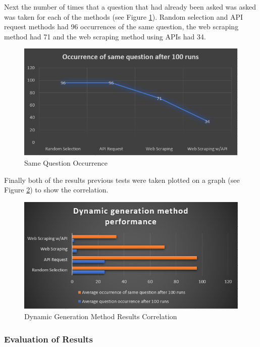 \documentclass[12pt,a4paper]{article}
\begin{document}
Next the number of times that a question that had already been asked was asked was taken for each of the methods (see Figure \ref{r2}). Random selection and API request methods had 96 occurrences of the same question, the web scraping method had 71 and the web scraping method using APIs had 34.

\begin{figure}[!ht]
    \centering
    \includegraphics[width=1.0\textwidth]{Figs/results2.PNG} 
    \caption{Same Question Occurrence} 
    \label{r2}
\end{figure}  

Finally both of the results previous tests were taken plotted on a graph  (see Figure \ref{r3}) to show the correlation.

\begin{figure}[!ht]
    \centering
    \includegraphics[width=1.0\textwidth]{Figs/results3.PNG} 
    \caption{Dynamic Generation Method Results Correlation} 
    \label{r3}
\end{figure}  

\subsubsection{Evaluation of Results} 
\end{document}
